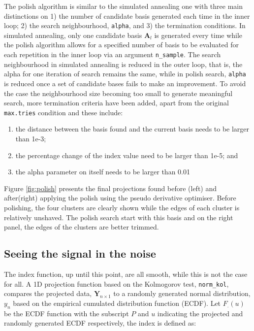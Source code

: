 The polish algorithm is similar to the simulated annealing one with
three main distinctions on 1) the number of candidate basis generated
each time in the inner loop; 2) the search neighbourhood,
\texttt{alpha}, and 3) the termination conditions. In simulated
annealing, only one candidate basis \(\mathbf{A}_l\) is generated every
time while the polish algorithm allows for a specified number of basis
to be evaluated for each repetition in the inner loop via an argument
\texttt{n\_sample}. The search neighbourhood in simulated annealing is
reduced in the outer loop, that is, the alpha for one iteration of
search remains the same, while in polish search, \texttt{alpha} is
reduced once a set of candidate bases fails to make an improvement. To
avoid the case the neighbourhood size becoming too small to generate
meaningful search, more termination criteria have been added, apart from
the original \texttt{max.tries} condition and these include:

\begin{enumerate}
\def\labelenumi{\arabic{enumi})}
\tightlist
\item
  the distance between the basis found and the current basis needs to be
  larger than 1e-3;
\item
  the percentage change of the index value need to be larger than 1e-5;
  and
\item
  the alpha parameter on itself needs to be larger than 0.01
\end{enumerate}

Figure \ref{fig:polish} presents the final projections found before
(left) and after(right) applying the polish using the pseudo derivative
optimiser. Before polishing, the four clusters are clearly shown while
the edges of each cluster is relatively unshaved. The polish search
start with this basis and on the right panel, the edges of the clusters
are better trimmed.

\hypertarget{seeing-the-signal-in-the-noise}{%
\subsection{Seeing the signal in the
noise}\label{seeing-the-signal-in-the-noise}}

The index function, up until this point, are all smooth, while this is
not the case for all. A 1D projection function based on the Kolmogorov
test, \texttt{norm\_kol}, compares the projected data,
\(\mathbf{Y}_{n \times 1}\) to a randomly generated normal distribution,
\(y_n\) based on the empirical cumulated distribution function (ECDF).
Let \(F_{.}(u)\) be the ECDF function with the subscript \(P\) and \(u\)
indicating the projected and randomly generated ECDF respectively, the
index is defined as:

